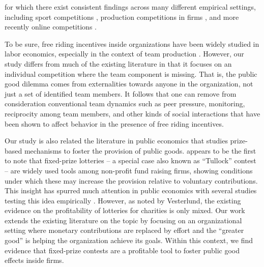 \documentclass[11pt, titlepage]{article}
\begin{document}
for which there exist consistent findings across many different
empirical settings, including sport competitions
\citep{ehrenberg1990tournaments}, production competitions in firms
\citep{knoeber1994testing, terwiesch2008innovation}, and more recently
online competitions
\citep{boudreau2011incentives, boudreau2016performance}.

To be sure, free riding incentives inside organizations have been widely
studied in labor economics, especially in the context of team production
\citep{erev1993constructive, hamilton2003team, boning2007opportunity, gibbs2014field}.
However, our study differs from much of the existing literature in that
it focuses on an individual competition where the team component is
missing. That is, the public good dilemma comes from externalities
towards anyone in the organization, not just a set of identified team
members. It follows that one can remove from consideration conventional
team dynamics such as peer pressure, monitoring, reciprocity among team
members, and other kinds of social interactions that have been shown to
affect behavior in the presence of free riding incentives.

Our study is also related the literature in public economics that
studies prize-based mechanisms to foster the provision of public goods.
\citet{morgan2000funding} appears to be the first to note that
fixed-prize lotteries -- a special case also known as ``Tullock''
contest -- are widely used tools among non-profit fund raising firms,
showing conditions under which these may increase the provision relative
to voluntary contributions. This insight has spurred much attention in
public economics with several studies testing this idea empirically
\citep[see][ for a survey]{vesterlund2012voluntary}. However, as noted
by Vesterlund, the existing evidence on the profitability of lotteries
for charities is only mixed. Our work extends the existing literature on
the topic by focusing on an organizational setting where monetary
contributions are replaced by effort and the ``greater good'' is helping
the organization achieve its goals. Within this context, we find
evidence that fixed-prize contests are a profitable tool to foster
public good effects inside firms.
\end{document}
